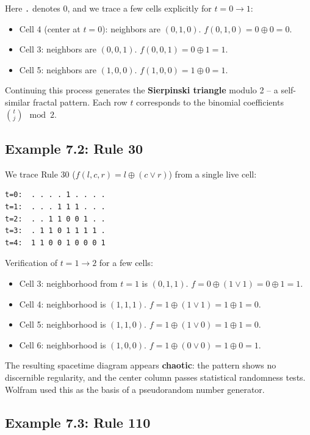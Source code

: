 Here \texttt{.} denotes 0, and we trace a few cells explicitly for $t = 0 \to 1$:

\begin{itemize}
  \item Cell 4 (center at $t=0$): neighbors are $(0, 1, 0)$. $f(0,1,0) = 0 \oplus 0 = 0$.
  \item Cell 3: neighbors are $(0, 0, 1)$. $f(0,0,1) = 0 \oplus 1 = 1$.
  \item Cell 5: neighbors are $(1, 0, 0)$. $f(1,0,0) = 1 \oplus 0 = 1$.
\end{itemize}

Continuing this process generates the \textbf{Sierpinski triangle} modulo 2 -- a self-similar fractal pattern. Each row $t$ corresponds to the binomial coefficients $\binom{t}{j} \mod 2$.


\subsection{Example 7.2: Rule 30}

We trace Rule 30 ($f(l,c,r) = l \oplus (c \lor r)$) from a single live cell:

\begin{lstlisting}
t=0:  . . . . 1 . . . .
t=1:  . . . 1 1 1 . . .
t=2:  . . 1 1 0 0 1 . .
t=3:  . 1 1 0 1 1 1 1 .
t=4:  1 1 0 0 1 0 0 0 1
\end{lstlisting}

Verification of $t = 1 \to 2$ for a few cells:

\begin{itemize}
  \item Cell 3: neighborhood from $t=1$ is $(0, 1, 1)$. $f = 0 \oplus (1 \lor 1) = 0 \oplus 1 = 1$.
  \item Cell 4: neighborhood is $(1, 1, 1)$. $f = 1 \oplus (1 \lor 1) = 1 \oplus 1 = 0$.
  \item Cell 5: neighborhood is $(1, 1, 0)$. $f = 1 \oplus (1 \lor 0) = 1 \oplus 1 = 0$.
  \item Cell 6: neighborhood is $(1, 0, 0)$. $f = 1 \oplus (0 \lor 0) = 1 \oplus 0 = 1$.
\end{itemize}

The resulting spacetime diagram appears \textbf{chaotic}: the pattern shows no discernible regularity, and the center column passes statistical randomness tests. Wolfram used this as the basis of a pseudorandom number generator.


\subsection{Example 7.3: Rule 110}

